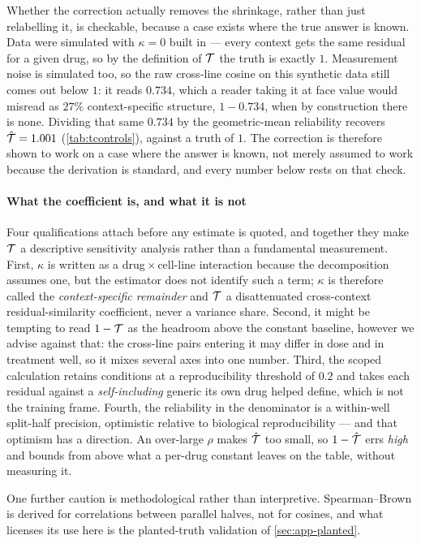 Whether the correction actually removes the shrinkage, rather than just
relabelling it, is checkable, because a case exists where the true answer is
known. Data were simulated with $\kappa = 0$ built in --- every context gets the
same residual for a given drug, so by the definition of $\mathcal{T}$ the truth is
exactly $1$. Measurement noise is simulated too, so the raw cross-line cosine on
this synthetic data still comes out below $1$: it reads $0.734$, which a reader
taking it at face value would misread as $27\%$ context-specific structure,
$1 - 0.734$, when by construction there is none. Dividing that same $0.734$ by
the geometric-mean reliability recovers $\hat{\mathcal{T}} = 1.001$
(\cref{tab:tcontrols}), against a truth of $1$. The correction is therefore shown
to work on a case where the answer is known, not merely assumed to work because
the derivation is standard, and every number below rests on that check.

\paragraph{What the coefficient is, and what it is not} Four qualifications attach
before any estimate is quoted, and together they make $\mathcal{T}$ a descriptive
sensitivity analysis rather than a fundamental measurement. First, $\kappa$ is
written as a drug\,$\times$\,cell-line interaction because the decomposition
assumes one, but the estimator does not identify such a term; $\kappa$ is therefore
called the \emph{context-specific remainder} and $\mathcal{T}$ a disattenuated
cross-context residual-similarity coefficient, never a variance share. Second, it might be tempting to read $1 - \mathcal{T}$ as the headroom above the constant baseline, however we advise against that: the cross-line pairs
entering it may differ in dose and in treatment well, so it mixes several
axes into one number. Third, the scoped calculation retains conditions at a
reproducibility threshold of $0.2$ and takes each residual against a
\emph{self-including} generic its own drug helped define, which is not the training
frame. Fourth, the reliability in the denominator is a within-well split-half
precision, optimistic relative to biological reproducibility --- and that optimism
has a direction. An over-large $\rho$ makes $\hat{\mathcal{T}}$ too small, so
$1 - \hat{\mathcal{T}}$ errs \emph{high} and bounds from above what a per-drug constant
leaves on the table, without measuring it.

One further caution is methodological rather than interpretive. Spearman--Brown is
derived for correlations between parallel halves, not for cosines, and what
licenses its use here is the planted-truth validation of \cref{sec:app-planted}.



